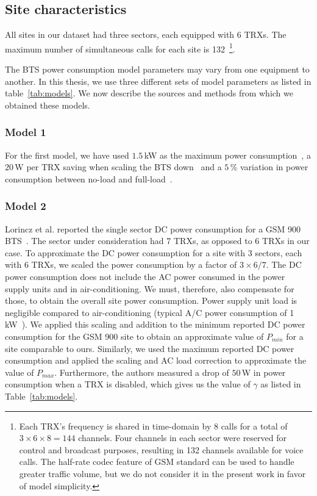 \subsection{Site characteristics}
\label{subsec:sitetypes} All sites in our dataset had three sectors, each equipped with 6 TRXs. The maximum number of simultaneous calls for each site is 132~\footnote{Each TRX's frequency is shared in time-domain  by 8 calls for  a total of $3\times6\times8=144$ channels. Four channels in each sector were reserved for control and broadcast purposes, resulting in 132 channels available for voice calls. The half-rate codec feature of GSM standard can be used to handle greater traffic volume, but we do not consider it in the present work in favor of model simplicity.}. 

The BTS power consumption model parameters may vary from one equipment to another. In this thesis, we use three different sets of model parameters as listed in table~\ref{tab:models}. We now describe the sources and methods from which we obtained these models.

\subsubsection{Model 1}
\label{subsubsec:model1}For the first model, we have used $1.5$\,kW as the maximum power consumption~\cite{mbakwe:btshybribpower:2011:necec}, a $20$\,W per TRX saving when scaling the BTS down~\cite{flexibsc} and a $5$\,\% variation in power consumption between no-load and full-load~\cite{Peng:2011:BTSSaving:Mobicom}.

\subsubsection{Model 2}
\label{subsubsec:model2} Lorincz et al. reported the single sector DC power consumption for a GSM 900 BTS~\cite{Lorincz:BTS-Measure:Sensors:2012}. The sector under consideration had 7 TRXs, as opposed to 6 TRXs in our case. To approximate the DC power consumption for a site with 3 sectors, each with 6 TRXs, we scaled the power consumption by a factor of $3\times6/7$. The DC power consumption does not include the AC power consumed in the power supply units and in air-conditioning. We must, therefore, also compensate for those, to obtain the overall site power consumption. Power supply unit load is negligible compared to air-conditioning (typical A/C power consumption of 1 kW~\cite{mbakwe:btshybribpower:2011:necec}). We applied this scaling and addition to the minimum reported DC power consumption for the GSM 900 site to obtain an approximate value of $P_{min}$ for a site comparable to ours. Similarly, we used the maximum reported DC power consumption and applied the scaling and AC load correction to approximate the value of $P_{max}$. Furthermore, the authors measured a drop of $50$\,W in power consumption when a TRX is disabled, which gives us the value of $\gamma$ as listed in Table~\ref{tab:models}.


